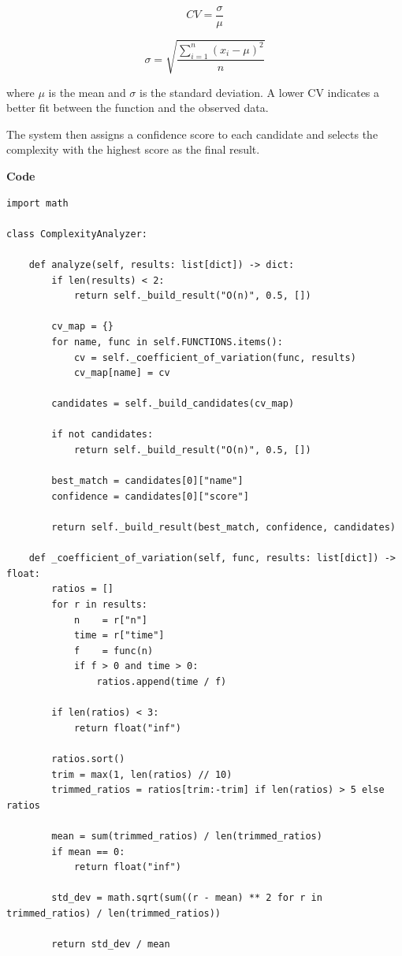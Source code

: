 \documentclass[12pt]{article}
\begin{document}
$$
CV = \frac{\sigma}{\mu}
$$

\[
\sigma = \sqrt{\frac{\sum_{i=1}^{n}(x_i - \mu)^2}{n}}
\]

where $\mu$ is the mean and $\sigma$ is the standard deviation. A lower CV indicates a better fit between the function and the observed data.

The system then assigns a confidence score to each candidate and selects the complexity with the highest score as the final result.


\vspace{1cm}
\textbf{Code}

\begin{lstlisting}
import math

class ComplexityAnalyzer:

    def analyze(self, results: list[dict]) -> dict:
        if len(results) < 2:
            return self._build_result("O(n)", 0.5, [])
        
        cv_map = {}
        for name, func in self.FUNCTIONS.items():
            cv = self._coefficient_of_variation(func, results)
            cv_map[name] = cv

        candidates = self._build_candidates(cv_map)

        if not candidates:
            return self._build_result("O(n)", 0.5, [])

        best_match = candidates[0]["name"]
        confidence = candidates[0]["score"]

        return self._build_result(best_match, confidence, candidates)

    def _coefficient_of_variation(self, func, results: list[dict]) -> float:
        ratios = []
        for r in results:
            n    = r["n"]
            time = r["time"]
            f    = func(n)
            if f > 0 and time > 0:
                ratios.append(time / f)

        if len(ratios) < 3:
            return float("inf")
        
        ratios.sort()
        trim = max(1, len(ratios) // 10)
        trimmed_ratios = ratios[trim:-trim] if len(ratios) > 5 else ratios

        mean = sum(trimmed_ratios) / len(trimmed_ratios)
        if mean == 0:
            return float("inf")

        std_dev = math.sqrt(sum((r - mean) ** 2 for r in trimmed_ratios) / len(trimmed_ratios))

        return std_dev / mean


\end{lstlisting}
\end{document}
